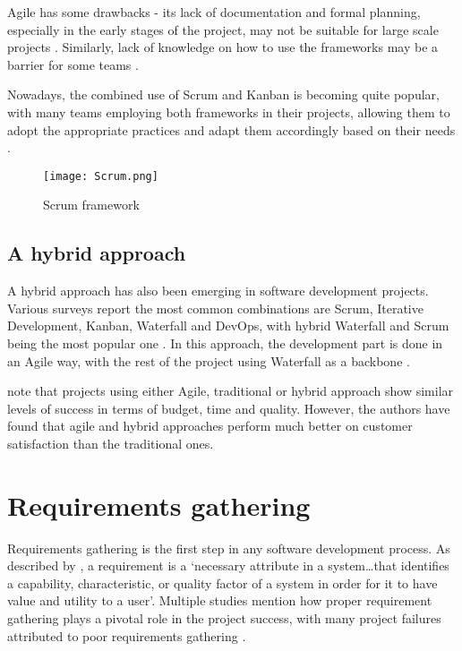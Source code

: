 Agile has some drawbacks - its lack of documentation and formal planning, especially in the early stages of the project, may not be suitable for large scale projects \parencite{agile, sdlc2}. Similarly, lack of knowledge on how to use the frameworks may be a barrier for some teams \parencite{waterfallno, sdlc2}.

Nowadays, the combined use of Scrum and Kanban is becoming quite popular, with many teams employing both frameworks in their projects, allowing them to adopt the appropriate practices and adapt them accordingly based on their needs \parencite{scrumban}.

\begin{figure}[ht]
    \centering
    \texttt{[image: Scrum.png]}
    \caption{Scrum framework}
    \label{fig:scrum}
\end{figure}

\subsection{A hybrid approach}

A hybrid approach has also been emerging in software development projects. Various surveys report the most common combinations are Scrum, Iterative Development, Kanban, Waterfall and DevOps, with hybrid Waterfall and Scrum being the most popular one \parencite{hybrid1,hybrid2}. In this approach, the development part is done in an Agile way, with the rest of the project using Waterfall as a backbone \parencite{hybrid2}.

\textcite{hybrid1} note that projects using either Agile, traditional or hybrid approach show similar levels of success in terms of budget, time and quality. However, the authors have found that agile and hybrid approaches perform much better on customer satisfaction than the traditional ones.

\section{Requirements gathering}

Requirements gathering is the first step in any software development process. As described by \textcite{reqanalysis2}, a requirement is a `necessary attribute in a system\ldots that identifies a capability, characteristic, or quality factor of a system in order for it to have value and utility to a user'. Multiple studies mention how proper requirement gathering plays a pivotal role in the project success, with many project failures attributed to poor requirements gathering \parencite{reqanalysis1, reqanalysis3, reqanalysis5}.

